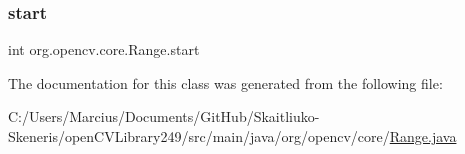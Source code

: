 \subsubsection{\texorpdfstring{start}{start}}
{\footnotesize\ttfamily int org.\+opencv.\+core.\+Range.\+start}



The documentation for this class was generated from the following file\+:\begin{DoxyCompactItemize}
\item 
C\+:/\+Users/\+Marcius/\+Documents/\+Git\+Hub/\+Skaitliuko-\/\+Skeneris/open\+C\+V\+Library249/src/main/java/org/opencv/core/\mbox{\hyperlink{_range_8java}{Range.\+java}}\end{DoxyCompactItemize}
